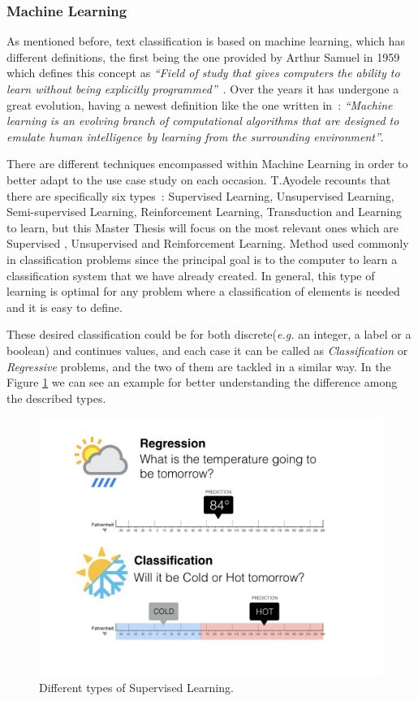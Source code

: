 \subsubsection{Machine Learning}
As mentioned before, text classification is based on machine learning, which has different definitions, the first being the one provided by Arthur Samuel in 1959 which defines this concept as \textit{``Field of study that gives computers the ability to learn without being explicitly programmed''}~\cite{samuel1959some}.
Over the years it has undergone a great evolution, having a newest definition like the one written in~\cite{el2015machine}: \textit{``Machine learning is an evolving branch of computational algorithms that are designed to emulate human intelligence by learning from the surrounding environment''}.

There are different techniques encompassed within Machine Learning in order to better adapt to the use case study on each occasion. T.Ayodele recounts that there are specifically six types~\cite{ayodele2010types}: Supervised Learning, Unsupervised Learning, Semi-supervised Learning,  Reinforcement Learning, Transduction and Learning to learn, but this Master Thesis will focus on the most relevant ones which are Supervised , Unsupervised and Reinforcement Learning.
Method used commonly in classification problems since the principal goal is to the computer to learn a classification system that we have already created. In general, this type of learning is optimal for any problem where a classification of elements is needed and it is easy to define. 

These desired classification could be for both discrete(\textit{e.g.} an integer, a label or a boolean) and continues values, and each case it can be called as \textit{Classification} or \textit{Regressive} problems, and the two of them are tackled in a similar way. In the Figure \ref{fig:supervised-learning} we can see an example for better understanding the difference among the described types.

\begin{figure}[!h]
    \centering
    \includegraphics[scale=0.27]{img/state-of-art/supervised-learning.jpeg}
    \caption{Different types of Supervised Learning.}
    \label{fig:supervised-learning}
\end{figure}

